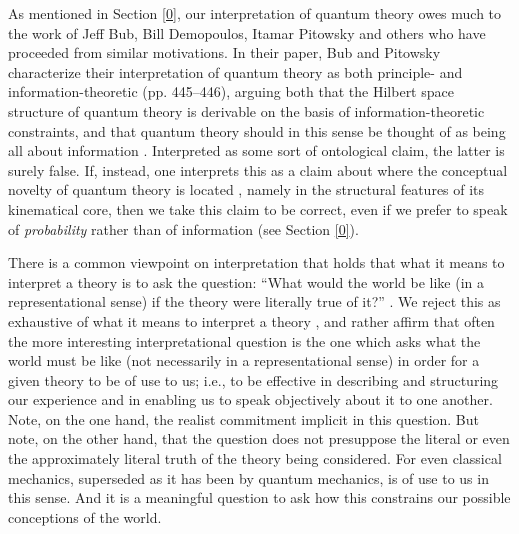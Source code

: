 As mentioned in Section \ref{0}, our interpretation of quantum theory owes much to the work of Jeff Bub, Bill Demopoulos, Itamar Pitowsky and others who have proceeded from similar motivations. In their \citeyear{Bub and Pitowsky 2010} paper, Bub and Pitowsky characterize their interpretation of quantum theory as both principle- and information-theoretic (pp. 445--446), arguing both that the Hilbert space structure of quantum theory is derivable on the basis of information-theoretic constraints, and that quantum theory should in this sense be thought of as being all about information \citep[cf.][]{Bub 2004}. Interpreted as some sort of ontological claim, the latter is surely false. If, instead, one interprets this as a claim about where the conceptual novelty of quantum theory is located \citep[cf.][]{Demopoulos 2018}, namely in the structural features of its kinematical core, then we take this claim to be correct, even if we prefer to speak of \emph{probability} rather than of information (see Section \ref{0}).

There is a common viewpoint on interpretation that holds that what it means to interpret a theory is to ask the question: ``What would the world be like (in a representational sense) if the theory were literally true of it?'' \citep[cf., for instance,][p. 153]{Caulton 2015}. We reject this as exhaustive of what it means to interpret a theory \citep[cf. also][]{Curiel 2019}, and rather affirm that often the more interesting interpretational question is the one which asks what the world must be like (not necessarily in a representational sense) in order for a given theory to be of use to us; i.e., to be effective in describing and structuring our experience and in enabling us to speak objectively about it to one another. Note, on the one hand, the realist commitment implicit in this question. But note, on the other hand, that the question does not presuppose the literal or even the approximately literal truth of the theory being considered. For even classical mechanics, superseded as it has been by quantum mechanics, is of use to us in this sense. And it is a meaningful question to ask how this constrains our possible conceptions of the world.


